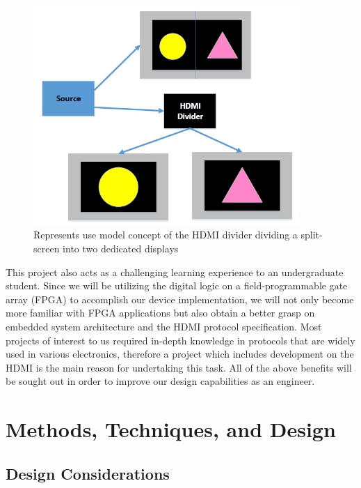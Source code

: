 \documentclass[12pt]{article}
\begin{document}
\begin{figure}[H]
\centering
\includegraphics[width=0.9\textwidth]{Concept.jpg}
\caption{Represents use model concept of the HDMI divider dividing a split-screen into two dedicated displays}
\label{fig:concept}
\end{figure}

This project also acts as a challenging learning experience to an undergraduate student. Since we will be utilizing the digital logic on a field-programmable gate array (FPGA) to accomplish our device implementation, we will not only become more familiar with FPGA applications but also obtain a better grasp on embedded system architecture and the HDMI protocol specification. Most projects of interest to us required in-depth knowledge in protocols that are widely used in various electronics, therefore a project which includes development on the HDMI is the main reason for undertaking this task. All of the above benefits will be sought out in order to improve our design capabilities as an engineer. 

\section{Methods, Techniques, and Design}

\subsection{Design Considerations}
\end{document}
